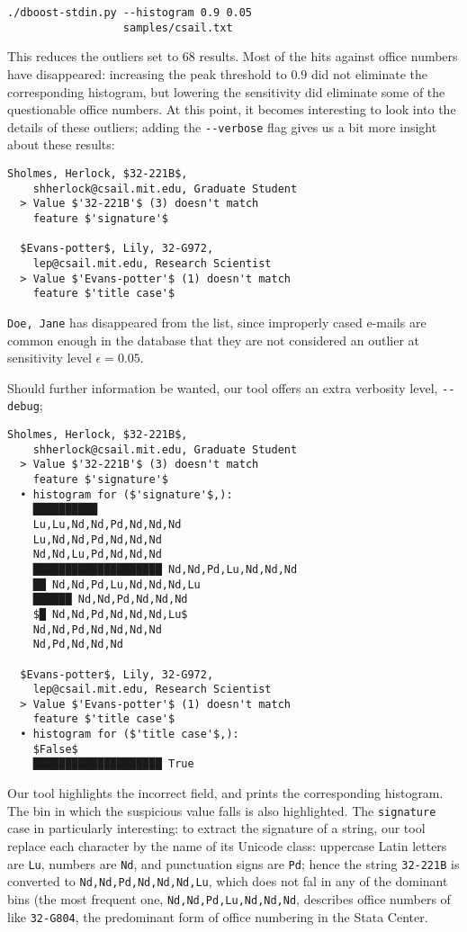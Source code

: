 \begin{lstlisting}[gobble=2]
./dboost-stdin.py --histogram 0.9 0.05 
                  samples/csail.txt
\end{lstlisting}

This reduces the outliers set to $68$ results. Most of the hits against office numbers have disappeared: increasing the peak threshold to $0.9$ did not eliminate the corresponding histogram, but lowering the sensitivity did eliminate some of the questionable office numbers. At this point, it becomes interesting to look into the details of these outliers; adding the \lstinline{--verbose} flag gives us a bit more insight about these results:

\begin{lstlisting}[gobble=2]
  Sholmes, Herlock, $32-221B$, 
    shherlock@csail.mit.edu, Graduate Student
  > Value $'32-221B'$ (3) doesn't match 
    feature $'signature'$
 
  $Evans-potter$, Lily, 32-G972, 
    lep@csail.mit.edu, Research Scientist
  > Value $'Evans-potter'$ (1) doesn't match 
    feature $'title case'$  
\end{lstlisting}

\lstinline{Doe, Jane} has disappeared from the list, since improperly cased e-mails are common enough in the database that they are not considered an outlier at sensitivity level $\epsilon = 0.05$.
 
Should further information be wanted, our tool offers an extra verbosity level, \lstinline{--debug};

\begin{lstlisting}[gobble=2]
  Sholmes, Herlock, $32-221B$, 
    shherlock@csail.mit.edu, Graduate Student
  > Value $'32-221B'$ (3) doesn't match 
    feature $'signature'$
  • histogram for ($'signature'$,):
    ██████████ 
    Lu,Lu,Nd,Nd,Pd,Nd,Nd,Nd
    Lu,Nd,Nd,Pd,Nd,Nd,Nd
    Nd,Nd,Lu,Pd,Nd,Nd,Nd
    ████████████████████ Nd,Nd,Pd,Lu,Nd,Nd,Nd
    ██ Nd,Nd,Pd,Lu,Nd,Nd,Nd,Lu
    ██████ Nd,Nd,Pd,Nd,Nd,Nd
    $█ Nd,Nd,Pd,Nd,Nd,Nd,Lu$
    Nd,Nd,Pd,Nd,Nd,Nd,Nd
    Nd,Pd,Nd,Nd,Nd

  $Evans-potter$, Lily, 32-G972, 
    lep@csail.mit.edu, Research Scientist
  > Value $'Evans-potter'$ (1) doesn't match 
    feature $'title case'$  
  • histogram for ($'title case'$,):
    $False$
    ████████████████████ True
\end{lstlisting}

Our tool highlights the incorrect field, and prints the corresponding histogram. The bin in which the suspicious value falls is also highlighted. The \lstinline{signature} case in particularly interesting: to extract the signature of a string, our tool replace each character by the name of its Unicode class: uppercase Latin letters are \lstinline{Lu}, numbers are \lstinline{Nd}, and punctuation signs are \lstinline{Pd}; hence the string \lstinline{32-221B} is converted to \lstinline{Nd,Nd,Pd,Nd,Nd,Nd,Lu}, which does not fal in any of the dominant bins (the most frequent one, \lstinline{Nd,Nd,Pd,Lu,Nd,Nd,Nd}, describes office numbers of like \lstinline{32-G804}, the predominant form of office numbering in the Stata Center.  

